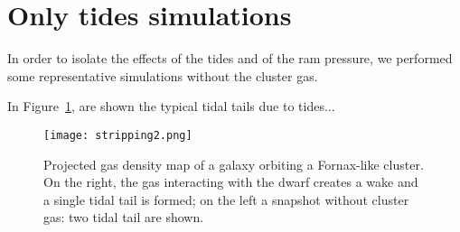 \section{Only tides simulations}
In order to isolate the effects of the tides and of the ram pressure, we performed some representative simulations without the cluster gas.

In Figure~\ref{fig:gas_no_gas}, are shown the typical tidal tails due to tides...

\begin{figure}[ht]
 \centering
 \texttt{[image: stripping2.png]}
 \caption{Projected gas density map of a galaxy orbiting a Fornax-like cluster.
 On the right, the gas interacting with the dwarf creates a wake and a single tidal tail is formed; on the left a snapshot without cluster gas: two tidal tail are shown.}
 \label{fig:gas_no_gas}
\end{figure}

